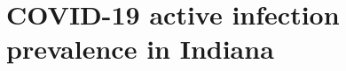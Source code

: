 \documentclass[11pt]{amsart}
\numberwithin{equation}{section}
\theoremstyle{plain}
\begin{document}
 \section{COVID-19 active infection prevalence in Indiana}
 \label{section:applications}

\end{document}
